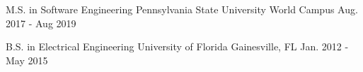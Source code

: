 

\begin{cventries}

	\cventry
	{M.S. in Software Engineering} %
	{Pennsylvania State University} %
	{World Campus} %
	{Aug. 2017 - Aug 2019} %
	{
		\begin{cvitems} %
		\end{cvitems}
	}

  \cventry
    {B.S. in Electrical Engineering} %
    {University of Florida} %
    {Gainesville, FL} %
    {Jan. 2012 - May 2015} %
		{
			\begin{cvitems} %
			\end{cvitems}
		}

\end{cventries}
